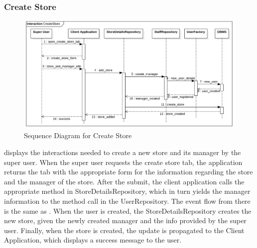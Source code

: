 \subsubsection{Create Store}
\begin{figure}[H]
    \centering
    \includegraphics[height=0.4\textwidth]{Images/SequenceDiagrams/CreateStore.png}
    \caption{Sequence Diagram for Create Store}
    \label{fig:SDCreateStore}
\end{figure}
 displays the interactions needed to create a new store and its manager by the super user.
When the super user requests the create store tab, the application returns the tab with the appropriate form for the information regarding the store and the manager of the store.
After the submit, the client application calls the appropriate method in StoreDetailsRepository, which in turn yields the manager information to the method call in the UserRepository.
The event flow from there is the same as .
When the user is created, the StoreDetailsRepository creates the new store, given the newly created manager and the info provided by the super user.
Finally, when the store is created, the update is propagated to the Client Application, which displays a success message to the user.

